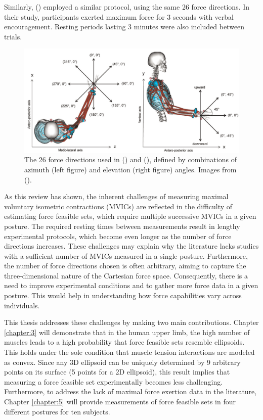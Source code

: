 Similarly, (\cite{hernandezIsometricForceCapabilities2015}) employed a similar protocol, using the same 26 force directions. In their study, participants exerted maximum force for 3 seconds with verbal encouragement. Resting periods lasting 3 minutes were also included between trials.
\begin{figure}[!htb]
    \captionsetup{justification=centering}
        \centering
        \includegraphics[trim={0 0 0 0},clip,width=1\linewidth]{img/chapter_1/axis_hernandez_rezzoug.png}
    \caption{The 26 force directions used in (\cite{rezzougUpperLimbIsometricForce2021b}) and (\cite{hernandezIsometricForceCapabilities2015}), defined by combinations of azimuth (left figure) and elevation (right figure) angles. Images from (\cite{hernandezIsometricForceCapabilities2015}).}
    \label{fig:rezzoug_hernandez_directions}
\end{figure}

As this review has shown, the inherent challenges of measuring maximal voluntary isometric contractions (MVICs) are reflected in the difficulty of estimating force feasible sets, which require multiple successive MVICs in a given posture. The required resting times between measurements result in lengthy experimental protocols, which become even longer as the number of force directions increases. These challenges may explain why the literature lacks studies with a sufficient number of MVICs measured in a single posture. Furthermore, the number of force directions chosen is often arbitrary, aiming to capture the three-dimensional nature of the Cartesian force space. Consequently, there is a need to improve experimental conditions and to gather more force data in a given posture. This would help in understanding how force capabilities vary across individuals.

This thesis addresses these challenges by making two main contributions. Chapter \ref{chapter:3} will demonstrate that in the human upper limb, the high number of muscles leads to a high probability that force feasible sets resemble ellipsoids. This holds under the sole condition that muscle tension interactions are modeled as convex. Since any 3D ellipsoid can be uniquely determined by 9 arbitrary points on its surface (5 points for a 2D ellipsoid), this result implies that measuring a force feasible set experimentally becomes less challenging. Furthermore, to address the lack of maximal force exertion data in the literature, Chapter \ref{chapter:5} will provide measurements of force feasible sets in four different postures for ten subjects.

